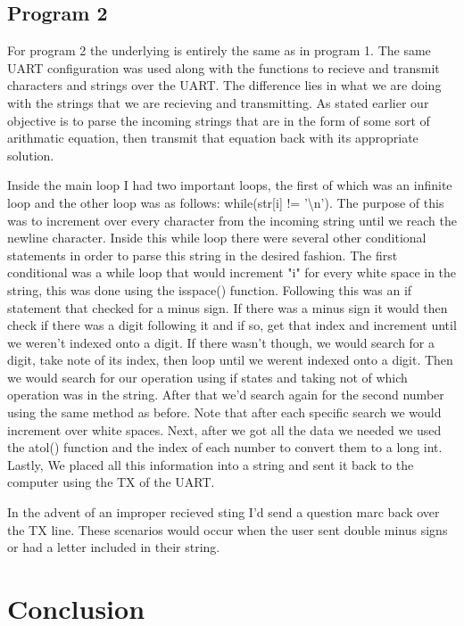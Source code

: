 \documentclass[11pt,pdftex,portrait,letterpaper]{article}
\begin{document}
	
	\subsection{Program 2}
	
	For program 2 the underlying is entirely the same as in program 1. The same UART configuration was used along with the functions to recieve and transmit characters and strings over the UART. The difference lies in what we are doing with the strings that we are recieving and transmitting. As stated earlier our objective is to parse the incoming strings that are in the form of some sort of arithmatic equation, then transmit that equation back with its appropriate solution. 
	
	Inside the main loop I had two important loops, the first of which was an infinite loop and the other loop was as follows: while(str[i] != '\textbackslash n'). The purpose of this was to increment over every character from the incoming string until we reach the newline character. Inside this while loop there were several other conditional statements in order to parse this string in the desired fashion. The first conditional was a while loop that would increment "i" for every white space in the string, this was done using the isspace() function. Following this was an if statement that checked for a minus sign. If there was a minus sign it would then check if there was a digit following it and if so,  get that index and increment until we weren't indexed onto a digit. If there wasn't though, we would search for a digit, take note of its index, then loop until we werent indexed onto a digit. Then we would search for our operation using if states and taking not of which operation was in the string. After that we'd search again for the second number using the same method as before. Note that after each specific search we would increment over white spaces. Next, after we got all the data we needed we used the atol() function and the index of each number to convert them to a long int. Lastly, We placed all this information into a string and sent it back to the computer using the TX of the UART. 
	
	In the advent of an improper recieved sting I'd send a question marc back over the TX line. These scenarios would occur when the user sent double minus signs or had a letter included in their string.
	
	
	
	
	\section{Conclusion}
	
\end{document}

